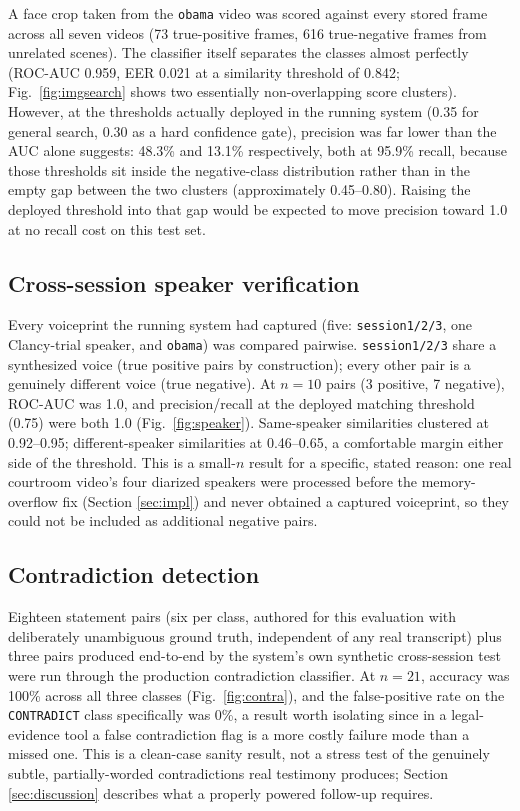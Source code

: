 \documentclass[3p,times,procedia]{elsarticle}
\begin{document}
A face crop taken from the \texttt{obama} video was scored against every stored frame
across all seven videos (73 true-positive frames, 616 true-negative frames from
unrelated scenes). The classifier itself separates the classes almost perfectly
(ROC-AUC 0.959, EER 0.021 at a similarity threshold of 0.842; Fig.~\ref{fig:imgsearch}
shows two essentially non-overlapping score clusters). However, at the thresholds
actually deployed in the running system (0.35 for general search, 0.30 as a hard
confidence gate), precision was far lower than the AUC alone suggests: 48.3\% and
13.1\% respectively, both at 95.9\% recall, because those thresholds sit inside the
negative-class distribution rather than in the empty gap between the two clusters
(approximately 0.45--0.80). Raising the deployed threshold into that gap would be
expected to move precision toward 1.0 at no recall cost on this test set.

\subsection{Cross-session speaker verification}

Every voiceprint the running system had captured (five: \texttt{session1/2/3}, one
Clancy-trial speaker, and \texttt{obama}) was compared pairwise. \texttt{session1/2/3}
share a synthesized voice (true positive pairs by construction); every other pair is a
genuinely different voice (true negative). At $n=10$ pairs (3 positive, 7 negative),
ROC-AUC was 1.0, and precision/recall at the deployed matching threshold (0.75) were
both 1.0 (Fig.~\ref{fig:speaker}). Same-speaker similarities clustered at 0.92--0.95;
different-speaker similarities at 0.46--0.65, a comfortable margin either side of the
threshold. This is a small-$n$ result for a specific, stated reason: one real
courtroom video's four diarized speakers were processed before the memory-overflow fix
(Section \ref{sec:impl}) and never obtained a captured voiceprint, so they could not be
included as additional negative pairs.

\subsection{Contradiction detection}

Eighteen statement pairs (six per class, authored for this evaluation with
deliberately unambiguous ground truth, independent of any real transcript) plus three
pairs produced end-to-end by the system's own synthetic cross-session test were run
through the production contradiction classifier. At $n=21$, accuracy was 100\% across
all three classes (Fig.~\ref{fig:contra}), and the false-positive rate on the
\texttt{CONTRADICT} class specifically was 0\%, a result worth isolating since in a
legal-evidence tool a false contradiction flag is a more costly failure mode than a
missed one. This is a clean-case sanity result, not a stress test of the genuinely
subtle, partially-worded contradictions real testimony produces; Section
\ref{sec:discussion} describes what a properly powered follow-up requires.
\end{document}

